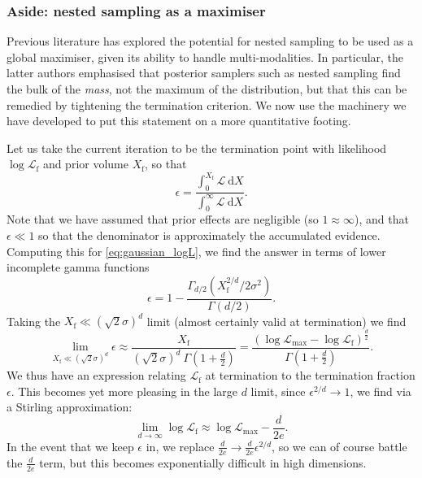 \documentclass[usenatbib]{mnras}
\newcommand{\Like}{\mathcal{L}}
\begin{document}
\subsubsection*{Aside: nested sampling as a maximiser}
Previous literature \citep{Akrami_2010, Feroz_2011} has explored the potential for nested sampling to be used as a global maximiser, given its ability to handle multi-modalities. In particular, the latter authors emphasised that posterior samplers such as nested sampling find the bulk of the \textit{mass}, not the maximum of the distribution, but that this can be remedied by tightening the termination criterion. We now use the machinery we have developed to put this statement on a more quantitative footing. 
\par
Let us take the current iteration to be the termination point with likelihood $\log\Like_\mathrm{f}$ and prior volume $X_\mathrm{f}$, so that
\begin{equation}
	\epsilon = \frac{\int_0^{X_\mathrm{f}} \mathcal{L}\ \mathrm{d}X}{\int_0^\infty \mathcal{L}\ \mathrm{d}X}.
\end{equation}
Note that we have assumed that prior effects are negligible (so $1\approx \infty$), and that $\epsilon \ll 1$ so that the denominator is approximately the accumulated evidence. Computing this for \eqref{eq:gaussian_logL}, we find the answer in terms of lower incomplete gamma functions
\begin{equation}
\epsilon = 1- \frac{\Gamma_{d/2}\left(X_\mathrm{f}^{2/d}/2\sigma^2\right)}{\Gamma(d/2)}.
\end{equation}
Taking the $X_\mathrm{f}\ll (\sqrt{2}\sigma)^d$ limit (almost certainly valid at termination) we find
\begin{equation}
    \lim_{X_\mathrm{f}\ll (\sqrt{2}\sigma)^d} \epsilon \approx \frac{X_\mathrm{f}}{(\sqrt{2}\sigma)^d \ \Gamma\left(1+\frac{d}{2}\right)} = \frac{(\log\mathcal{L}_\mathrm{max}-\log\mathcal{L}_\mathrm{f})^{\frac{d}{2}}}{\Gamma\left(1+\frac{d}{2}\right)}.
\end{equation}
We thus have an expression relating $\mathcal{L}_\mathrm{f}$ at termination to the termination fraction $\epsilon$. This becomes yet more pleasing in the large $d$ limit, since $\epsilon^{2/d}\to 1$, we find via a Stirling approximation:
\begin{equation}
    \lim_{d\to\infty} \log\mathcal{L}_\mathrm{f} \approx \log\mathcal{L}_\mathrm{max} - \frac{d}{2e}.
\end{equation}
In the event that we keep $\epsilon$ in, we replace $\frac{d}{2e}\to \frac{d}{2e}\epsilon^{2/d}$, so we can of course battle the $\frac{d}{2e}$ term, but this becomes exponentially difficult in high dimensions.
\end{document}
